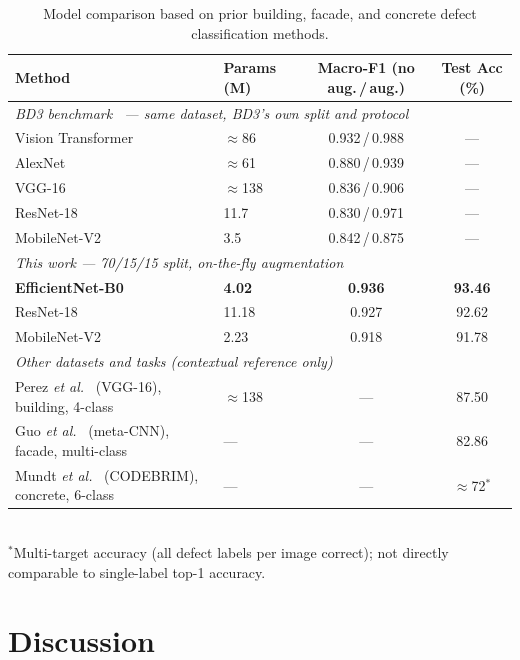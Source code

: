\documentclass[ASNA, twocolumn]{USG}
\begin{document}
\begin{table}[t]
\caption{Model comparison based on prior building, facade, and concrete defect classification methods.}
\label{tab:comparison}
\centering
\begin{tabular}{llcc}
\toprule
\textbf{Method} & \textbf{Params (M)} & \textbf{Macro-F1 (no aug.\,/\,aug.)} & \textbf{Test Acc (\%)} \\
\midrule
\multicolumn{4}{l}{\textit{BD3 benchmark~\cite{ref40} --- same dataset, BD3's own split and protocol}}\\
Vision Transformer~\cite{ref40} & $\approx$86  & 0.932\,/\,0.988 & --- \\
AlexNet~\cite{ref40}            & $\approx$61  & 0.880\,/\,0.939 & --- \\
VGG-16~\cite{ref40}             & $\approx$138 & 0.836\,/\,0.906 & --- \\
ResNet-18~\cite{ref40}          & 11.7         & 0.830\,/\,0.971 & --- \\
MobileNet-V2~\cite{ref40}       & 3.5          & 0.842\,/\,0.875 & --- \\
\midrule
\multicolumn{4}{l}{\textit{This work --- 70/15/15 split, on-the-fly augmentation}}\\
\textbf{EfficientNet-B0}        & \textbf{4.02}  & \textbf{0.936} & \textbf{93.46} \\
ResNet-18                       & 11.18          & 0.927 & 92.62 \\
MobileNet-V2                    & 2.23           & 0.918 & 91.78 \\
\midrule
\multicolumn{4}{l}{\textit{Other datasets and tasks (contextual reference only)}}\\
Perez \textit{et al.}~\cite{ref9} (VGG-16), building, 4-class  & $\approx$138 & --- & 87.50 \\
Guo \textit{et al.}~\cite{ref10} (meta-CNN), facade, multi-class & ---        & --- & 82.86 \\
Mundt \textit{et al.}~\cite{ref11} (CODEBRIM), concrete, 6-class & ---        & --- & $\approx$72$^{*}$ \\
\bottomrule
\end{tabular}
\\[2pt]
{\footnotesize $^{*}$Multi-target accuracy (all defect labels per image correct); not directly comparable to single-label top-1 accuracy.}
\end{table}

\section{Discussion}
\end{document}
